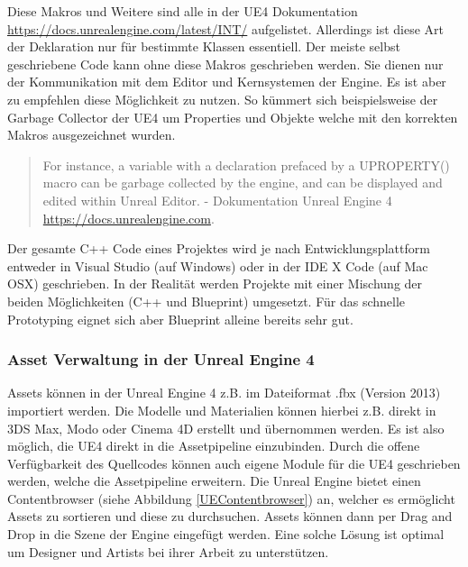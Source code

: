 \documentclass[pagesize, paper=a4, fontsize=12pt, titlepage=true, headings=small, headnosepline, abstractoff, liststotoc, nochapterprefix, plainheadsepline, twoside]{scrreprt}
\begin{document}


Diese Makros und Weitere sind alle in der UE4 Dokumentation \url{https://docs.unrealengine.com/latest/INT/} aufgelistet. Allerdings ist diese Art der Deklaration nur für bestimmte Klassen essentiell. Der meiste selbst geschriebene Code kann ohne diese Makros geschrieben werden. Sie dienen nur der Kommunikation mit dem Editor und Kernsystemen der Engine. Es ist aber zu empfehlen diese Möglichkeit zu nutzen. So kümmert sich beispielsweise der Garbage Collector der UE4 um Properties und Objekte welche mit den korrekten Makros ausgezeichnet wurden. 
\begin{quote}
\glqq For instance, a variable with a declaration prefaced by a UPROPERTY() macro can be garbage collected by the engine, and can be displayed and edited within Unreal Editor.\grqq{} \autocite{UnrealEngine4} - Dokumentation Unreal Engine 4 \url{https://docs.unrealengine.com}.
\end{quote}
Der gesamte C++ Code eines Projektes wird je nach Entwicklungsplattform entweder in Visual Studio (auf Windows) oder in der IDE X Code (auf Mac OSX) geschrieben. In der Realität werden Projekte mit einer Mischung der beiden Möglichkeiten (C++ und Blueprint) umgesetzt. Für das schnelle Prototyping eignet sich aber Blueprint alleine bereits sehr gut.

\subsubsection{Asset Verwaltung in der Unreal Engine 4}
Assets können in der Unreal Engine 4 z.B. im Dateiformat .fbx (Version 2013) importiert werden. Die Modelle und Materialien können hierbei z.B. direkt in 3DS Max, Modo oder Cinema 4D erstellt und übernommen werden. Es ist also möglich, die UE4 direkt in die Assetpipeline einzubinden. Durch die offene Verfügbarkeit des Quellcodes können auch eigene Module für die UE4 geschrieben werden, welche die Assetpipeline erweitern. Die Unreal Engine bietet einen Contentbrowser (siehe Abbildung \ref{UEContentbrowser}) an, welcher es ermöglicht Assets zu sortieren und diese zu durchsuchen. Assets können dann per Drag and Drop in die Szene der Engine eingefügt werden. Eine solche Lösung ist optimal um Designer und Artists bei ihrer Arbeit zu unterstützen.
\end{document}

